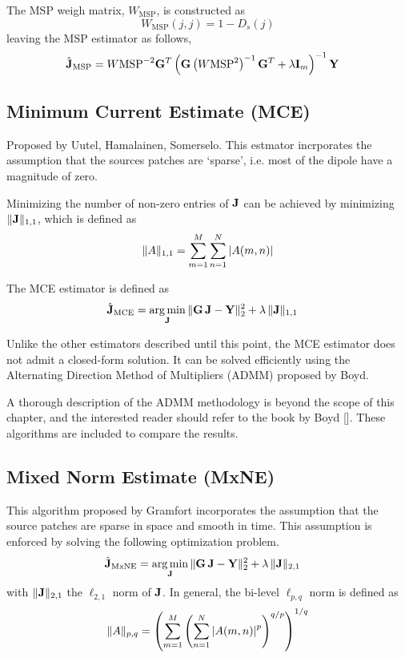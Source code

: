 The MSP weigh matrix, $W_\text{MSP}$, is constructed as
\begin{equation}
W_\text{MSP}(j,j) = 1-{D}_s(j)
\end{equation}
leaving the MSP estimator as follows,
\begin{align}
\hat{\mathbf{J}}_\text{MSP} &=
{W\text{MSP}}^{-2} \mathbf{G}^T \left(  \mathbf{G}\left( W\text{MSP}^2 \right)^{-1}\mathbf{G}^T + \lambda \mathbf{I}_m   \right)^{-1} \mathbf{Y}
\label{est:MSP}
\end{align}

\subsection{Minimum Current Estimate (MCE)}

Proposed by Uutel, Hamalainen, Somerselo.
%
This estmator incrporates the assumption that the sources patches are `sparse', i.e. most of the dipole have a magnitude of zero.

Minimizing the number of non-zero entries of $\mathbf{J}$ can be achieved by minimizing $\lVert \mathbf{J} \rVert_{1,1}$, which is defined as
\begin{equation}
\lVert A \rVert_{1,1} = \sum_{m=1}^M \sum_{n=1}^N \left| {A(m,n)} \right|
\end{equation}

The MCE estimator is defined as
\begin{align}
\hat{\mathbf{J}}_\text{MCE} &=
\operatorname*{arg\,min}_{\mathbf{J}}\, \lVert \mathbf{G}\, \mathbf{J} - \mathbf{Y}  \rVert_2^2 + \lambda\, \lVert \mathbf{J} \rVert_{1,1}
\label{est:MCE}
\end{align}

Unlike the other estimators described until this point, the MCE estimator does not admit a closed-form solution.
%
It can be solved efficiently using the Alternating Direction Method of Multipliers (ADMM) proposed by Boyd.

A thorough description of the ADMM methodology is beyond the scope of this chapter, and the interested reader should refer to the book by Boyd [].
%
These algorithms are included to compare the results.

\subsection{Mixed Norm Estimate (MxNE)}

This algorithm proposed by Gramfort incorporates the assumption that the source patches are sparse in space and smooth in time.
%
This assumption is enforced by solving the following optimization problem.
\begin{align}
\hat{\mathbf{J}}_\text{MxNE} &=
\operatorname*{arg\,min}_{\mathbf{J}}\, \lVert \mathbf{G}\, \mathbf{J} - \mathbf{Y}  \rVert_2^2 + \lambda\, \lVert \mathbf{J} \rVert_{2,1}
\label{est:MxNE}
\end{align}
with $\lVert \mathbf{J} \rVert_{2,1}$ the $\ell_{2,1}$ norm of $\mathbf{J}$.
%
In general, the bi-level $\ell_{p,q}$ norm is defined as
\begin{equation}
\lVert A \rVert_{p,q} =
\left( \sum_{m=1}^M \left(  \sum_{n=1}^N \left| {A(m,n)} \right|^p  \right)^{q/p} \right)^{1/q}
\end{equation}

